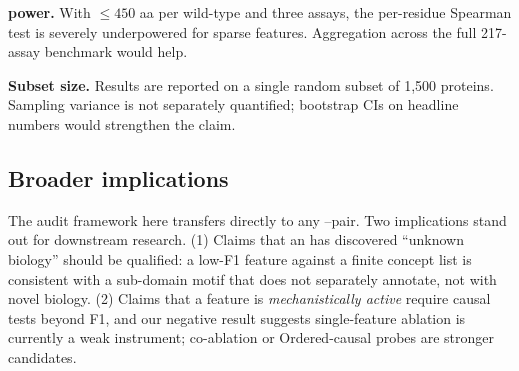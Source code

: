\textbf{\proteingym power.} With $\leq 450$ aa per wild-type and three assays, the per-residue Spearman test is severely underpowered for sparse features. Aggregation across the full 217-assay benchmark would help.

\textbf{Subset size.} Results are reported on a single random subset of 1{,}500 proteins. Sampling variance is not separately quantified; bootstrap CIs on headline numbers would strengthen the claim.

\subsection{Broader implications}

The audit framework here transfers directly to any \plm--\sae pair. Two implications stand out for downstream research. (1) Claims that an \sae has discovered ``unknown biology'' should be qualified: a low-F1 feature against a finite \swissprot concept list is consistent with a sub-domain motif that \swissprot does not separately annotate, not with novel biology. (2) Claims that a feature is \emph{mechanistically active} require causal tests beyond F1, and our negative result suggests single-feature ablation is currently a weak instrument; co-ablation or Ordered-\sae causal probes are stronger candidates.
